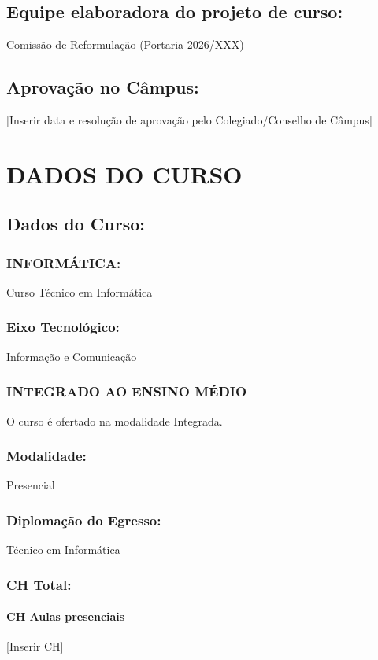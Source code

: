 \documentclass{../../modelos/latex-shared/ifsc-ppc}
\begin{document}
\subsection{Equipe elaboradora do projeto de curso:}
Comissão de Reformulação (Portaria 2026/XXX)

\subsection{Aprovação no Câmpus:}
[Inserir data e resolução de aprovação pelo Colegiado/Conselho de Câmpus]

\section{DADOS DO CURSO}
\subsection{Dados do Curso:}

\subsubsection{INFORMÁTICA:}
Curso Técnico em Informática

\subsubsection{Eixo Tecnológico:}
Informação e Comunicação

\subsubsection{INTEGRADO AO ENSINO MÉDIO}
O curso é ofertado na modalidade Integrada.

\subsubsection{Modalidade:}
Presencial

\subsubsection{Diplomação do Egresso:}
Técnico em Informática

\subsubsection{CH Total:}
\paragraph{CH Aulas presenciais}
[Inserir CH]
\end{document}
